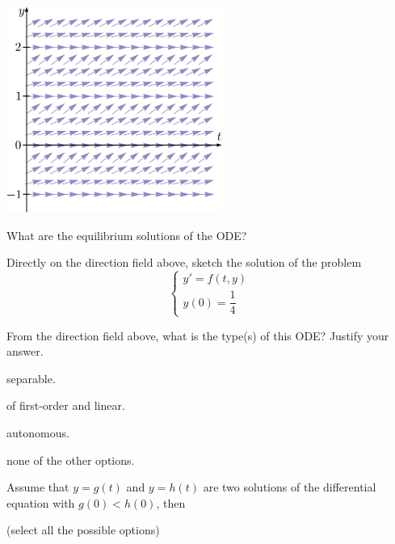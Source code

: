 \begin{center}
	\includegraphics*[width=200pt]{images/module12-dirfield.pdf}
\end{center}

\begin{parts}
	\item What are the equilibrium solutions of the ODE?


\item Directly on the direction field above, sketch the solution of the problem
$$
\begin{cases}
y'=f(t,y) \\
y(0) = \dfrac14
\end{cases}
$$

\item From the direction field above, what is the type(s) of this ODE? Justify your answer.

\begin{enumerate}[label={\bf (\alph*)}]
\hfil 
\begin{minipage}{.3\textwidth}
\item separable. \\[-10pt]
\item of first-order and linear.
\end{minipage}
\hfil
\begin{minipage}{.4\textwidth}
\item autonomous. \\[-10pt]
\item none of the other options.
\end{minipage}
\end{enumerate}

\item Assume that $y=g(t)$ and $y=h(t)$ are two solutions of the differential equation with $g(0)<h(0)$, then

\hfill (select all the possible options)\\[-10pt]


\end{parts}
